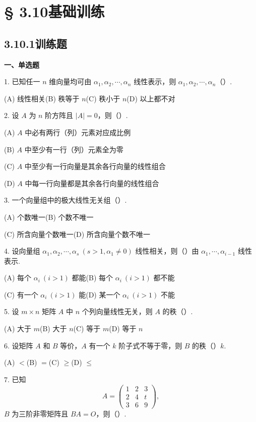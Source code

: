 \documentclass[UTF8, 12pt, fontset=fandol, oneside]{ctexart}
\begin{document}
\section*{§ 3.10\quad 基础训练}

\subsection*{3.10.1\quad 训练题}

\noindent\textbf{一、单选题}

1. 已知任一 $n$ 维向量均可由 $\alpha_1,\alpha_2,\cdots,\alpha_n$ 线性表示，则 $\alpha_1,\alpha_2,\cdots,\alpha_n$（\quad）.

(A) 线性相关\qquad (B) 秩等于 $n$\qquad (C) 秩小于 $n$\qquad (D) 以上都不对

2. 设 $A$ 为 $n$ 阶方阵且 $|A|=0$，则（\quad）.

(A) $A$ 中必有两行（列）元素对应成比例

(B) $A$ 中至少有一行（列）元素全为零

(C) $A$ 中至少有一行向量是其余各行向量的线性组合

(D) $A$ 中每一行向量都是其余各行向量的线性组合

3. 一个向量组中的极大线性无关组（\quad）.

(A) 个数唯一\qquad (B) 个数不唯一

(C) 所含向量个数唯一\qquad (D) 所含向量个数不唯一

4. 设向量组 $\alpha_1,\alpha_2,\cdots,\alpha_s\ (s>1,\alpha_1\ne 0)$ 线性相关，则（\quad）由 $\alpha_1,\cdots,\alpha_{i-1}$ 线性表示.

(A) 每个 $\alpha_i\ (i>1)$ 都能\qquad (B) 每个 $\alpha_i\ (i>1)$ 都不能

(C) 有一个 $\alpha_i\ (i>1)$ 能\qquad (D) 某一个 $\alpha_i\ (i>1)$ 不能

5. 设 $m\times n$ 矩阵 $A$ 中 $n$ 个列向量线性无关，则 $A$ 的秩（\quad）.

(A) 大于 $m$\qquad (B) 大于 $n$\qquad (C) 等于 $m$\qquad (D) 等于 $n$

6. 设矩阵 $A$ 和 $B$ 等价，$A$ 有一个 $k$ 阶子式不等于零，则 $B$ 的秩（\quad）$k$.

(A) $<$\qquad (B) $=$\qquad (C) $\ge$\qquad (D) $\le$

7. 已知
\[
A=\begin{pmatrix}
1&2&3\\
2&4&t\\
3&6&9
\end{pmatrix},
\]
$B$ 为三阶非零矩阵且 $BA=O$，则（\quad）.
\end{document}
